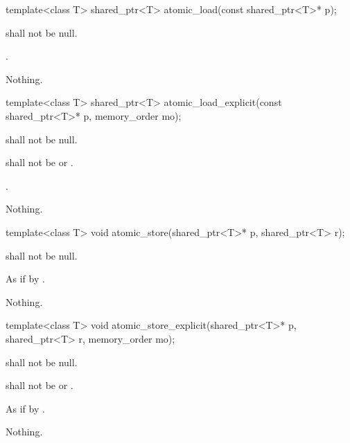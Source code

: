 %
\begin{itemdecl}
template<class T>
  shared_ptr<T> atomic_load(const shared_ptr<T>* p);
\end{itemdecl}

\begin{itemdescr}
\pnum
\requires {} shall not be null.

\pnum
\returns {}.

\pnum
\throws Nothing.
\end{itemdescr}

%
\begin{itemdecl}
template<class T>
  shared_ptr<T> atomic_load_explicit(const shared_ptr<T>* p, memory_order mo);
\end{itemdecl}

\begin{itemdescr}
\pnum
\requires {} shall not be null.

\pnum
\requires {} shall not be  or .

\pnum
\returns {}.

\pnum
\throws Nothing.
\end{itemdescr}

%
\begin{itemdecl}
template<class T>
  void atomic_store(shared_ptr<T>* p, shared_ptr<T> r);
\end{itemdecl}

\begin{itemdescr}
\pnum
\requires {} shall not be null.

\pnum
\effects As if by .

\pnum
\throws Nothing.
\end{itemdescr}

%
\begin{itemdecl}
template<class T>
  void atomic_store_explicit(shared_ptr<T>* p, shared_ptr<T> r, memory_order mo);
\end{itemdecl}

\begin{itemdescr}
\pnum
\requires {} shall not be null.

\pnum
\requires {} shall not be  or .

\pnum
\effects As if by .

\pnum
\throws Nothing.
\end{itemdescr}

